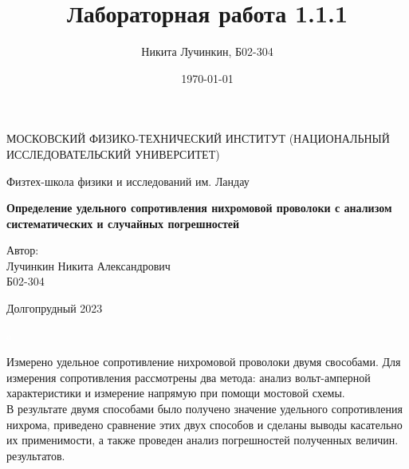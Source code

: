 \documentclass[12pt]{article}
\title{Лабораторная работа 1.1.1}
\author{Никита Лучинкин, Б02-304}
\date{\today}
\begin{document}
\begin{titlepage}
	\begin{center}
		{\large МОСКОВСКИЙ ФИЗИКО-ТЕХНИЧЕСКИЙ ИНСТИТУТ (НАЦИОНАЛЬНЫЙ ИССЛЕДОВАТЕЛЬСКИЙ УНИВЕРСИТЕТ)}
	\end{center}
	\begin{center}
		{\large Физтех-школа физики и исследований им. Ландау}
	\end{center}
	
	
	\vspace{3cm}
	{\huge
		\begin{center}
			\textbf{Определение удельного сопротивления нихромовой проволоки с анализом систематических и случайных погрешностей}
		\end{center}
	}
	\vspace{2cm}
	\begin{flushright}
		{\LARGE Автор:\\ Лучинкин Никита Александрович \\
			\vspace{0.2cm}
			Б02-304}
	\end{flushright}
	\vspace{7 cm}
	\begin{center}
		Долгопрудный 2023
	\end{center}
\end{titlepage}

\begin{table}[H]
    \begin{minipage}{0.15\textwidth}
        \textcolor{white}{a}
    \end{minipage}
    \small
    \begin{minipage}{0.7\textwidth}
    Измерено удельное сопротивление нихромовой проволоки двумя свособами. Для измерения сопротивления рассмотрены два метода: анализ вольт-амперной характеристики и измерение напрямую при помощи мостовой схемы.\\
    В результате двумя способами было получено значение удельного сопротивления нихрома, приведено сравнение этих двух способов и сделаны выводы касательно их применимости, а также проведен анализ погрешностей полученных величин. результатов.
    \end{minipage}

    
\end{table}
\end{document}
